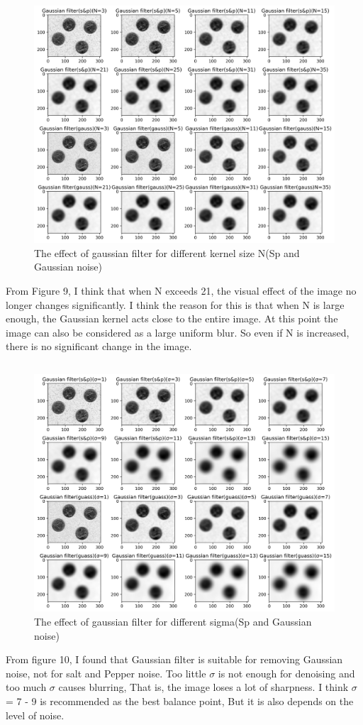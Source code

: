 \documentclass[12pt]{article}
\begin{document}
    \subsection{}  
    \begin{figure}[ht]
        \centering
            \includegraphics[width=0.7\columnwidth, keepaspectratio]{pics/a2-3.2}
        \caption[]{The effect of gaussian filter for different kernel size N(Sp and Gaussian noise)}
        \label{fig:3.4}
    \end{figure}
    From Figure 9, I think that when N exceeds 21, the visual effect of the image no longer changes significantly. I think the reason for this is that when N is large enough, the Gaussian kernel acts close to the entire image. At this point the image can also be considered as a large uniform blur. So even if N is increased, there is no significant change in the image.


    \subsection{}
    \begin{figure}[ht]
        \centering
            \includegraphics[width=0.7\columnwidth, keepaspectratio]{pics/a2-3.3}
        \caption[]{The effect of gaussian filter for different sigma(Sp and Gaussian noise)}
        \label{fig:3.5}
    \end{figure}
    From figure 10, I found that Gaussian filter is suitable for removing Gaussian noise, not for salt and Pepper noise. Too little $\sigma$ is not enough for denoising and too much $\sigma$ causes blurring, That is, the image loses a lot of sharpness. I think $\sigma$ = 7 - 9 is recommended as the best balance point, But it is also depends on the level of noise.
\end{document}
